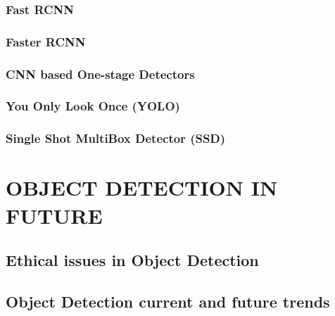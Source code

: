 \documentclass[12pt]{article}
\begin{document}
\subsubsection*{Fast RCNN}
\subsubsection*{Faster RCNN}

\subsubsection{CNN based One-stage Detectors}
\label{sec:one_stage}

\subsubsection*{You Only Look Once (YOLO)}
\subsubsection*{Single Shot MultiBox Detector (SSD)}


\section{OBJECT DETECTION IN FUTURE}
\label{sec:future}
\subsection{Ethical issues in Object Detection}
\label{sec:ethical}
\subsection{Object Detection current and future trends}
\label{sec:trend}


\newpage
\printbibliography
\end{document}
